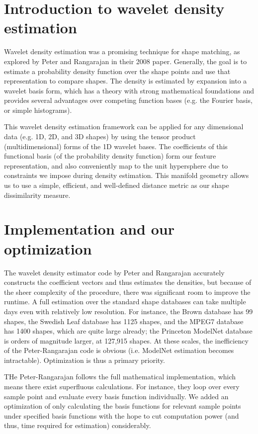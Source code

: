 \documentclass[../tech_report_1.tex]{subfiles}
\begin{document}
\section{Introduction to wavelet density estimation}

Wavelet density estimation was a promising technique for shape matching, as explored by Peter and Rangarajan in their 2008 paper\cite{peter2008WDE}. Generally, the goal is to estimate a probability density function over the shape points and use that representation to compare shapes. The density is estimated by expansion into a wavelet basis form, which has a theory with strong mathematical foundations and provides several advantages over competing function bases (e.g. the Fourier basis, or simple histograms). 

This wavelet density estimation framework can be applied for any dimensional data (e.g. 1D, 2D, and 3D shapes) by using the tensor product (multidimensional) forms of the 1D wavelet bases. The coefficients of this functional basis (of the probability density function) form our feature representation, and also conveniently map to the unit hypersphere due to constraints we impose during density estimation. This manifold geometry allows us to use a simple, efficient, and well-defined distance metric as our shape dissimilarity measure.

\section{Implementation and our optimization}

The wavelet density estimator code by Peter and Rangarajan accurately constructs the coefficient vectors and thus estimates the densities, but because of the sheer complexity of the procedure, there was significant room to improve the runtime. A full estimation over the standard shape databases can take multiple days even with relatively low resolution.
For instance, the Brown database has 99 shapes, the Swedish Leaf database has 1125 shapes, and the MPEG7 database has 1400 shapes, which are quite large already; the Princeton ModelNet database is orders of magnitude larger, at 127,915 shapes. At these scales, the inefficiency of the Peter-Rangarajan code is obvious (i.e. ModelNet estimation becomes intractable). Optimization is thus a primary priority.

THe Peter-Rangarajan follows the full mathematical implementation, which means there exist superfluous calculations. For instance, they loop over every sample point and evaluate every basis function individually. We added an optimization of only calculating the basis functions
for relevant sample points under specified basis functions with the
hope to cut computation power (and thus, time required for estimation) considerably.
\end{document}
